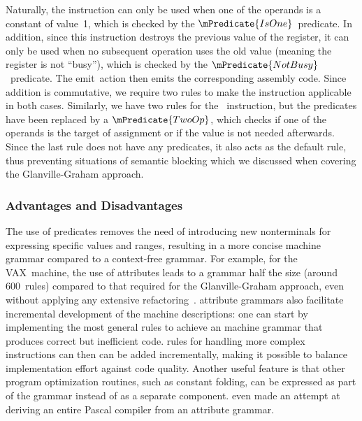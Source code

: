 %
Naturally, the  \gls{instruction} can only be used when one of the
operands is a constant of value~1, which is checked by the
$\mPredicate{IsOne}$~\gls{predicate}.
%
In addition, since this \gls{instruction} destroys the previous value of the
\gls{register}, it can only be used when no subsequent operation uses the old
value (meaning the \gls{register} is not ``busy''), which is checked by the
$\mPredicate{NotBusy}$~\gls{predicate}.
%
The emit~\gls{action} then emits the corresponding \gls{assembly code}.
%
Since addition is commutative, we require two \glspl{rule} to make the
\gls{instruction} applicable in both cases.
%
Similarly, we have two \glspl{rule} for the ~\gls{instruction},
but the \glspl{predicate} have been replaced by a $\mPredicate{TwoOp}$, which
checks if one of the operands is the target of assignment or if the value is not
needed afterwards.
%
Since the last \gls{rule} does not have any \glspl{predicate}, it also acts as
the default \gls{rule}, thus preventing situations of \gls{semantic blocking}
which we discussed when covering the \gls{Glanville-Graham approach}.


\subsubsection{Advantages and Disadvantages}

The use of \glspl{predicate} removes the need of introducing new
\glspl{nonterminal} for expressing specific values and ranges, resulting in a
more concise \gls{machine grammar} compared to a \gls{context-free grammar}.
%
For example, for the \gls{VAX}~machine, the use of \glspl{attribute} leads to a
\gls{grammar} half the size (around 600~\glspl{rule}) compared to that required
for the \gls{Glanville-Graham approach}, even without applying any extensive
\gls{refactoring}~\cite{GanapathiFischer:1985}.
%
\Glspl{attribute grammar} also facilitate incremental development of the
\glspl{machine description}: one can start by implementing the most general
\glspl{rule} to achieve an \gls{machine grammar} that produces correct but
inefficient code.
%
\Glspl{rule} for handling more complex \glspl{instruction} can then can be added
incrementally, making it possible to balance implementation effort against code
quality.
%
Another useful feature is that other \gls{program} optimization routines, such
as \gls{constant folding}, can be expressed as part of the \gls{grammar} instead
of as a separate component.
%
\textcite{Farrow:1982} even made an attempt at deriving an entire \gls{Pascal}
\gls{compiler} from an \gls{attribute grammar}.

